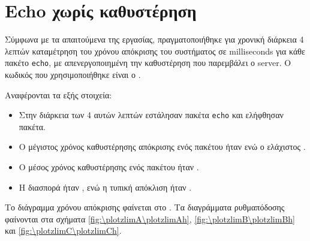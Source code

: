 \section{Echo χωρίς καθυστέρηση}
Σύμφωνα με τα απαιτούμενα της εργασίας, πραγματοποιήθηκε για χρονική διάρκεια 4 λεπτών καταμέτρηση του χρόνου απόκρισης του συστήματος σε milliseconds για κάθε πακέτο \texttt{echo}, με απενεργοποιημένη την καθυστέρηση που παρεμβάλει ο server.
Ο κωδικός που χρησιμοποιήθηκε είναι ο \echozcode{}.

Αναφέρονται τα εξής στοιχεία:
\begin{itemize}
\item Στην διάρκεια των 4 αυτών λεπτών εστάλησαν \echozsend{} πακέτα \texttt{echo} και ελήφθησαν \echozreceive{} πακέτα.
\item Ο μέγιστος χρόνος καθυστέρησης απόκρισης ενός πακέτου ήταν \maxechozms{} ενώ ο ελάχιστος \minechozms{}.
\item Ο μέσος χρόνος καθυστέρησης ενός πακέτου ήταν \meanechozms{}.
\item Η διασπορά ήταν \varechozms{}, ενώ η τυπική απόκλιση ήταν \stdechozms{}.
\end{itemize}

Το διάγραμμα χρόνου απόκρισης φαίνεται στο \imageref{\plotzresponsetime\plotzhist}.
Τα διαγράμματα ρυθμαπόδοσης φαίνονται στα σχήματα
\ref{fig:\plotzlimA\plotzlimAh},
\ref{fig:\plotzlimB\plotzlimBh}
και \ref{fig:\plotzlimC\plotzlimCh}.

\FloatBarrier
